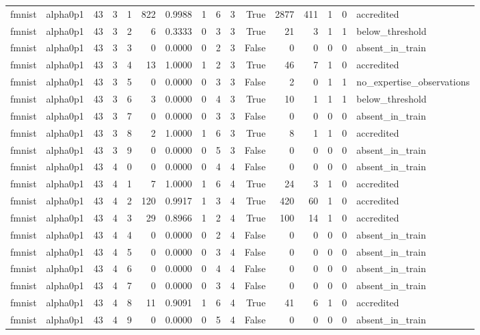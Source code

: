 \begin{tabular}{llrrrrrrrrrrrrrl}
fmnist & alpha0p1 & 43 & 3 & 1 & 822 & 0.9988 & 1 & 6 & 3 & True & 2877 & 411 & 1 & 0 & accredited \\
fmnist & alpha0p1 & 43 & 3 & 2 & 6 & 0.3333 & 0 & 3 & 3 & True & 21 & 3 & 1 & 1 & below\_threshold \\
fmnist & alpha0p1 & 43 & 3 & 3 & 0 & 0.0000 & 0 & 2 & 3 & False & 0 & 0 & 0 & 0 & absent\_in\_train \\
fmnist & alpha0p1 & 43 & 3 & 4 & 13 & 1.0000 & 1 & 2 & 3 & True & 46 & 7 & 1 & 0 & accredited \\
fmnist & alpha0p1 & 43 & 3 & 5 & 0 & 0.0000 & 0 & 3 & 3 & False & 2 & 0 & 1 & 1 & no\_expertise\_observations \\
fmnist & alpha0p1 & 43 & 3 & 6 & 3 & 0.0000 & 0 & 4 & 3 & True & 10 & 1 & 1 & 1 & below\_threshold \\
fmnist & alpha0p1 & 43 & 3 & 7 & 0 & 0.0000 & 0 & 3 & 3 & False & 0 & 0 & 0 & 0 & absent\_in\_train \\
fmnist & alpha0p1 & 43 & 3 & 8 & 2 & 1.0000 & 1 & 6 & 3 & True & 8 & 1 & 1 & 0 & accredited \\
fmnist & alpha0p1 & 43 & 3 & 9 & 0 & 0.0000 & 0 & 5 & 3 & False & 0 & 0 & 0 & 0 & absent\_in\_train \\
fmnist & alpha0p1 & 43 & 4 & 0 & 0 & 0.0000 & 0 & 4 & 4 & False & 0 & 0 & 0 & 0 & absent\_in\_train \\
fmnist & alpha0p1 & 43 & 4 & 1 & 7 & 1.0000 & 1 & 6 & 4 & True & 24 & 3 & 1 & 0 & accredited \\
fmnist & alpha0p1 & 43 & 4 & 2 & 120 & 0.9917 & 1 & 3 & 4 & True & 420 & 60 & 1 & 0 & accredited \\
fmnist & alpha0p1 & 43 & 4 & 3 & 29 & 0.8966 & 1 & 2 & 4 & True & 100 & 14 & 1 & 0 & accredited \\
fmnist & alpha0p1 & 43 & 4 & 4 & 0 & 0.0000 & 0 & 2 & 4 & False & 0 & 0 & 0 & 0 & absent\_in\_train \\
fmnist & alpha0p1 & 43 & 4 & 5 & 0 & 0.0000 & 0 & 3 & 4 & False & 0 & 0 & 0 & 0 & absent\_in\_train \\
fmnist & alpha0p1 & 43 & 4 & 6 & 0 & 0.0000 & 0 & 4 & 4 & False & 0 & 0 & 0 & 0 & absent\_in\_train \\
fmnist & alpha0p1 & 43 & 4 & 7 & 0 & 0.0000 & 0 & 3 & 4 & False & 0 & 0 & 0 & 0 & absent\_in\_train \\
fmnist & alpha0p1 & 43 & 4 & 8 & 11 & 0.9091 & 1 & 6 & 4 & True & 41 & 6 & 1 & 0 & accredited \\
fmnist & alpha0p1 & 43 & 4 & 9 & 0 & 0.0000 & 0 & 5 & 4 & False & 0 & 0 & 0 & 0 & absent\_in\_train \\

\end{tabular}
